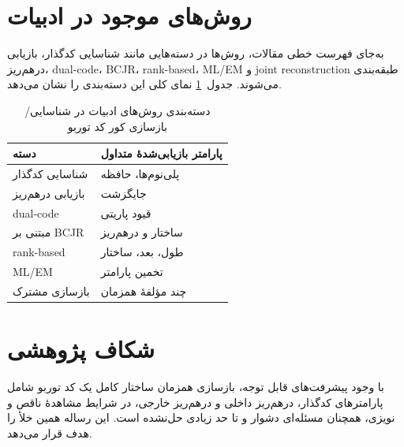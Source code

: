 \section{روش‌های موجود در ادبیات}
به‌جای فهرست خطی مقالات، روش‌ها در دسته‌هایی مانند شناسایی کدگذار، بازیابی درهم‌ریز، dual-code، BCJR، rank-based، ML/EM و joint reconstruction طبقه‌بندی می‌شوند. جدول~\ref{tab:lit-categories} نمای کلی این دسته‌بندی را نشان می‌دهد.

\begin{table}[ht]
	\caption{دسته‌بندی روش‌های ادبیات در شناسایی/بازسازی کور کد توربو}
	\label{tab:lit-categories}
	\centering
	\begin{tabularx}{0.95\textwidth}{|X|X|}
		\hline
		\textbf{دسته} & \textbf{پارامتر بازیابی‌شدهٔ متداول} \\
		\hline
		شناسایی کدگذار & پلی‌نوم‌ها، حافظه \\
		\hline
		بازیابی درهم‌ریز & جایگزشت \\
		\hline
		dual-code & قیود پاریتی \\
		\hline
		مبتنی بر BCJR & ساختار و درهم‌ریز \\
		\hline
		rank-based & طول، بعد، ساختار \\
		\hline
		ML/EM & تخمین پارامتر \\
		\hline
		بازسازی مشترک & چند مؤلفهٔ همزمان \\
		\hline
	\end{tabularx}
\end{table}

\section{شکاف پژوهشی}
با وجود پیشرفت‌های قابل توجه، بازسازی همزمان ساختار کامل یک کد توربو شامل پارامترهای کدگذار، درهم‌ریز داخلی و درهم‌ریز خارجی، در شرایط مشاهدهٔ ناقص و نویزی، همچنان مسئله‌ای دشوار و تا حد زیادی حل‌نشده است. این رساله همین خلأ را هدف قرار می‌دهد.
